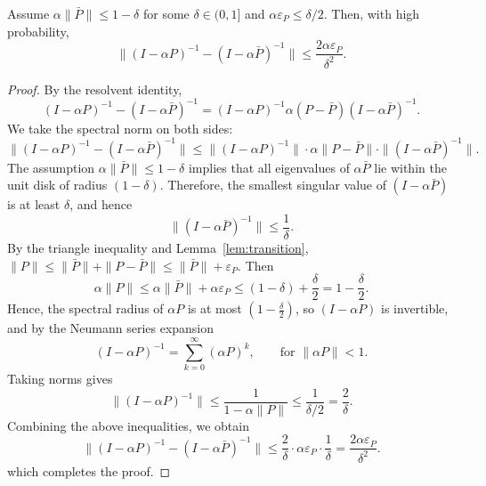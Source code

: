 \begin{lemma}
\label{lem:resolvent}
Assume $\alpha\|\bar P\|\le 1-\delta$ for some $\delta\in(0,1]$ and $\alpha\varepsilon_P \le \delta/2$. Then, with high probability,
\[
    \|(I-\alpha P)^{-1} - (I-\alpha \bar P)^{-1}\| \le \frac{2\alpha\varepsilon_P}{\delta^2}.
\]
\end{lemma}

\begin{proof}
By the resolvent identity,
\[
    (I-\alpha P)^{-1} - (I-\alpha \bar P)^{-1} = (I-\alpha P)^{-1}\alpha(P-\bar P)(I-\alpha \bar P)^{-1}.
\]
We take the spectral norm on both sides:
\[
    \|(I-\alpha P)^{-1} - (I-\alpha \bar P)^{-1}\| \le \|(I-\alpha P)^{-1}\| \cdot \alpha\|P-\bar P\| \cdot \|(I-\alpha \bar P)^{-1}\|.
\]
The assumption $\alpha\|\bar P\|\le 1-\delta$ implies that all eigenvalues of $\alpha\bar P$ lie within the unit disk of radius $(1-\delta)$. Therefore, the smallest singular value of $(I - \alpha\bar P)$ is at least $\delta$, and hence
\[
\|(I - \alpha \bar P)^{-1}\| \le \frac{1}{\delta}.
\]
By the triangle inequality and Lemma~\ref{lem:transition}, $\|P\| \le \|\bar P\| + \|P - \bar P\| \le \|\bar P\| + \varepsilon_P$.
Then
\[
\alpha\|P\| \le \alpha\|\bar P\| + \alpha\varepsilon_P 
\le (1 - \delta) + \frac{\delta}{2} = 1 - \frac{\delta}{2}.
\]
Hence, the spectral radius of $\alpha P$ is at most $(1 - \frac{\delta}{2})$, 
so $(I - \alpha P)$ is invertible, and by the Neumann series expansion
\[
(I - \alpha P)^{-1} = \sum_{k=0}^{\infty} (\alpha P)^k, \qquad \text{for } \|\alpha P\|<1.
\]
Taking norms gives
\[
\|(I - \alpha P)^{-1}\| \le \frac{1}{1 - \alpha\|P\|} 
\le \frac{1}{\delta/2} = \frac{2}{\delta}.
\]
Combining the above inequalities, we obtain
\[
    \|(I - \alpha P)^{-1} - (I - \alpha \bar P)^{-1}\| \le \frac{2}{\delta} \cdot \alpha\varepsilon_P \cdot \frac{1}{\delta} = \frac{2\alpha\varepsilon_P}{\delta^2}.
\]
which completes the proof. 
\end{proof}


